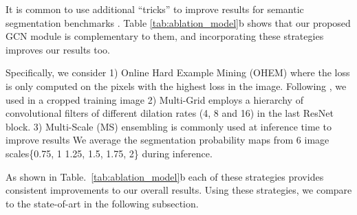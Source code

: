 \documentclass{bmvc2k}
\begin{document}
It is common to use additional ``tricks'' to improve results for semantic segmentation benchmarks \cite{deeplabv3,DAnet,ocnet,pspnet,ohem}.
Table \ref{tab:ablation_model}b shows that our proposed GCN module is complementary to them, and incorporating these strategies improves our results too.

Specifically, we consider 1) Online Hard Example Mining (OHEM) \cite{ohem,pohlen2017full,li2017holistic,ocnet} where the loss is only computed on the  pixels with the highest loss in the image. Following \cite{ocnet}, we used 
 in a  cropped training image
2) Multi-Grid \cite{deeplabv3,DAnet,seg_vplr_zhu_cvpr2019} employs a hierarchy of convolutional filters of different dilation rates (4, 8 and 16) in the last ResNet block. 
3) Multi-Scale (MS) ensembling is commonly used at inference time to improve results \cite{deeplabv1,deeplabv3p,pspnet,ocnet,DAnet,psanet,boxsup}
We average the segmentation probability maps from 6 image scales\{0.75, 1 1.25, 1.5, 1.75, 2\} during inference.

As shown in Table.~\ref{tab:ablation_model}b each of these strategies provides consistent improvements to our overall results.
Using these strategies, we compare to the state-of-art in the following subsection.
\end{document}
